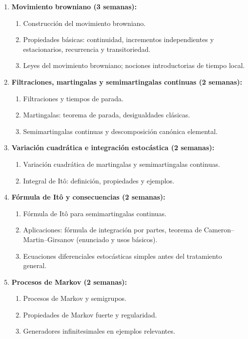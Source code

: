 \begin{refsection}
\begin{enumerate}
\item \textbf{Movimiento browniano (3 semanas):}
\begin{enumerate}
    \item Construcción del movimiento browniano.
    \item Propiedades básicas: continuidad, incrementos independientes y estacionarios, recurrencia y transitoriedad.
    \item Leyes del movimiento browniano; nociones introductorias de tiempo local.
\end{enumerate}

\item \textbf{Filtraciones, martingalas y semimartingalas continuas (2 semanas):}
\begin{enumerate}
    \item Filtraciones y tiempos de parada.
    \item Martingalas: teorema de parada, desigualdades clásicas.
    \item Semimartingalas continuas y descomposición canónica elemental.
\end{enumerate}

\item \textbf{Variación cuadrática e integración estocástica (2 semanas):}
\begin{enumerate}
    \item Variación cuadrática de martingalas y semimartingalas continuas.
    \item Integral de Itô: definición, propiedades y ejemplos.
\end{enumerate}

\item \textbf{Fórmula de Itô y consecuencias (2 semanas):}
\begin{enumerate}
    \item Fórmula de Itô para semimartingalas continuas.
    \item Aplicaciones: fórmula de integración por partes, teorema de Cameron--Martin--Girsanov (enunciado y usos básicos).
    \item Ecuaciones diferenciales estocásticas simples antes del tratamiento general.
\end{enumerate}

\item \textbf{Procesos de Markov (2 semanas):}
\begin{enumerate}
    \item Procesos de Markov y semigrupos.
    \item Propiedades de Markov fuerte y regularidad.
    \item Generadores infinitesimales en ejemplos relevantes.
\end{enumerate}


\end{enumerate}
\end{refsection}
